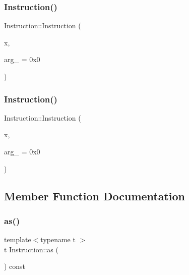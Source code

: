 \subsubsection{\texorpdfstring{Instruction()}{Instruction()}\hspace{0.1cm}{\footnotesize\ttfamily [2/3]}}
{\footnotesize\ttfamily Instruction\+::\+Instruction (\begin{DoxyParamCaption}\item[{\hyperlink{_instruction_8h_af2fb7c87c5854c5733d7bb0506b06de7}{Builtin\+Op}}]{x,  }\item[{int}]{arg\+\_\+ = {\ttfamily 0x0} }\end{DoxyParamCaption})\hspace{0.3cm}{\ttfamily [inline]}}

\mbox{\label{class_instruction_a62d7782f809fa55635a6ced1e971eb3b}} 
\subsubsection{\texorpdfstring{Instruction()}{Instruction()}\hspace{0.1cm}{\footnotesize\ttfamily [3/3]}}
{\footnotesize\ttfamily Instruction\+::\+Instruction (\begin{DoxyParamCaption}\item[{\hyperlink{_instruction_8h_a227278394efd1e2313c727102db09ea9}{Primitive\+Op}}]{x,  }\item[{int}]{arg\+\_\+ = {\ttfamily 0x0} }\end{DoxyParamCaption})\hspace{0.3cm}{\ttfamily [inline]}}



\subsection{Member Function Documentation}
\mbox{\label{class_instruction_ac99272000afeb9015a9d40ceed8c139b}} 
\subsubsection{\texorpdfstring{as()}{as()}}
{\footnotesize\ttfamily template$<$typename t $>$ \\
t Instruction\+::as (\begin{DoxyParamCaption}{ }\end{DoxyParamCaption}) const\hspace{0.3cm}{\ttfamily [inline]}}

